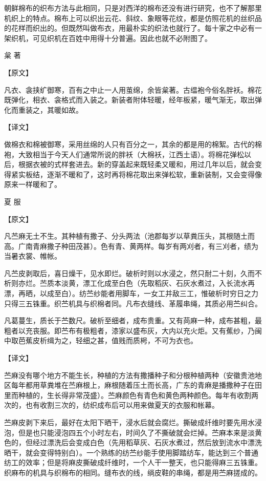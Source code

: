 \documentclass[12pt,UTF8]{ctexbook}
\begin{document}
朝鲜棉布的织布方法与此相同，只是对西洋的棉布还没有进行研究，也不了解那里机织上的特点。棉布上可以织出云花、斜纹、象眼等花纹，都是仿照花机的丝织品的花样而织出的。但既然叫做布衣，用最朴实的织法也就行了。每十家之中必有一架织机，可见织机在百姓中用得十分普遍。因此也就不必附图了。

枲 著

【原文】

凡衣、衾挟纩御寒，百有之中止一人用茧绵，余皆枲著。古缊袍今俗名胖袄。棉花既弹化，相衣、衾格式而入装之。新装者附体轻暖，经年板紧，暖气渐无，取出弹化而重装之，其暖如故。

【译文】

做棉衣和棉被御寒，采用丝绵的人只有百分之一，其余的都是用的棉絮。古代的棉袍，大致相当于今天人们通常所说的胖袄（大棉袄，江西土语）。将棉花弹松以后，根据衣被的式样套进去。新的穿盖起来既轻柔又暖和，用过几年以后，就会变得紧实板结，逐渐不暖和了，这时再将棉花取出来弹松软，重新装制，又会变得像原来一样暖和了。

夏 服

【原文】

凡苎麻无土不生。其种植有撒子、分头两法（池郡每岁以草粪压头，其根随土而高。广南青麻撒子种田茂甚）。色有青、黄两样。每岁有两刈者，有三刈者，绩为当暑衣裳、帷帐。

凡苎皮剥取后，喜日燥干，见水即烂。破析时则以水浸之，然只耐二十刻，久而不析则亦烂。苎质本淡黄，漂工化成至白色（先取稻灰、石灰水煮过，入长流水再漂，再晒，以成至白）。纺苎纱能者用脚车，一女工并敌三工，惟破析时穷日之力只得三五铢重。织苎机具与织棉者同。凡布衣缝线、革履串绳，其质必用苎纠合。

凡葛蔓生，质长于苎数尺。破析至细者，成布贵重。又有苘麻一种，成布甚粗，最粗者以充丧服。即苎布有极粗者，漆家以盛布灰，大内以充火炬。又有蕉纱，乃闽中取芭蕉皮析缉为之，轻细之甚，值贱而质枵，不可为衣也。

【译文】

苎麻没有哪个地方不能生长，种植的方法有撒播种子和分根种植两种（安徽贵池地区每年都用草粪堆在苎麻根上，麻根随着压土而长高，广东的青麻是播撒种子在田里而种植的，生长得非常茂盛）。苎麻颜色有青色和黄色两种颜色。每年有收割两次的，也有收割三次的，纺织成布后可以用来做夏天的衣服和帐幕。

苎麻皮剥下来后，最好在太阳下晒干，浸水后就会腐烂。撕破成纤维时要先用水浸泡，但是也只能浸泡四五个小时左右，时间久了不撕破就会烂掉。苎麻本来是淡黄色的，但经过漂洗后会变成白色（先用稻草灰、石灰水煮过，然后放到流水中漂洗晒干，就会变得特别白）。一个熟练的纺苎纱能手使用脚踏纺车，能达到三个普通纺工的效率；但是将麻皮撕破成纤维时，一个人干一整天，也只能得麻三五铢重。织麻布的机具与织棉布的相同。缝布衣的线，绱皮鞋的串绳，都是用苎麻搓成的。
\end{document}
